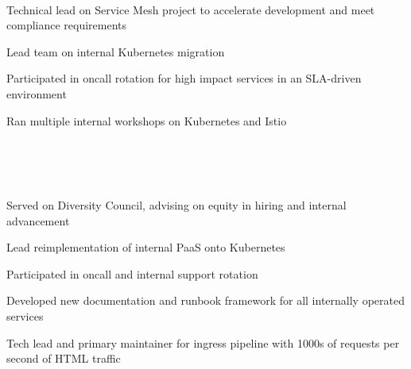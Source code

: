 \documentclass[letterpaper,11pt,notitlepage]{article}
\begin{document}

\vbar
{}
         \\
        \begin{employment}
          \item Technical lead on Service Mesh project to accelerate development
            and meet compliance requirements
          \item Lead team on internal Kubernetes migration
          \item Participated in oncall rotation for high impact services in an
            SLA-driven environment
          \item Ran multiple internal workshops on Kubernetes and Istio
          \end{employment}
           \\
           \\
           \\
          \begin{employment}
          \item Served on Diversity Council, advising on equity in hiring and internal advancement
          \item Lead reimplementation of internal PaaS onto Kubernetes
          \item Participated in oncall and internal support rotation
          \item Developed new documentation and runbook framework for all internally operated services
          \item Tech lead and primary maintainer for ingress pipeline with 1000s of requests per second of HTML traffic
          \end{employment}
           \\
           \\
           \\
\end{document}
